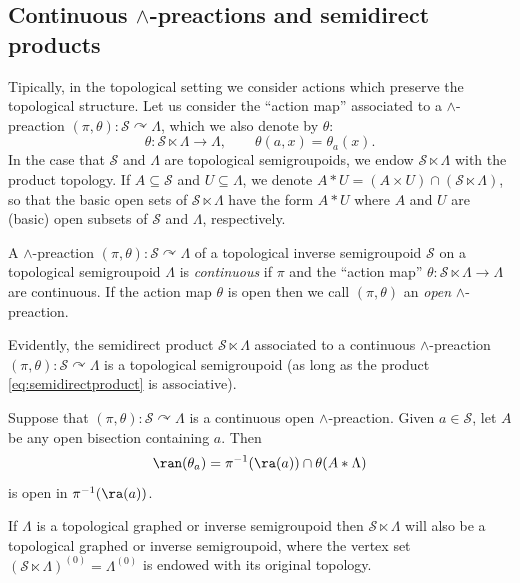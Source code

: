 \subsection{Continuous \texorpdfstring{$\land$}{∧}-preactions and semidirect products}\label{subsec:continuouslandpreactions}

Tipically, in the topological setting we consider actions which preserve the topological structure. Let us consider the ``action map'' associated to a $\land$-preaction $(\pi,\theta)\colon\mathcal{S}\curvearrowright\Lambda$, which we also denote by $\theta$:
\[\theta\colon\mathcal{S}\ltimes\Lambda\to\Lambda,\qquad\theta(a,x)=\theta_a(x).\]
In the case that $\mathcal{S}$ and $\Lambda$ are topological semigroupoids, we endow $\mathcal{S}\ltimes\Lambda$ with the product topology. If $A\subseteq\mathcal{S}$ and $U\subseteq\Lambda$, we denote $A\ast U=(A\times U)\cap(\mathcal{S}\ltimes\Lambda)$, so that the basic open sets of $\mathcal{S}\ltimes\Lambda$ have the form $A\ast U$ where $A$ and $U$ are (basic) open subsets of $\mathcal{S}$ and $\Lambda$, respectively.

\begin{definition}
    A $\land$-preaction $(\pi,\theta)\colon\mathcal{S}\curvearrowright\Lambda$ of a topological inverse semigroupoid $\mathcal{S}$ on a topological semigroupoid $\Lambda$ is \emph{continuous} if $\pi$ and the ``action map'' $\theta\colon\mathcal{S}\ltimes\Lambda\to\Lambda$ are continuous. If the action map $\theta$ is open then we call $(\pi,\theta)$ an \emph{open} $\land$-preaction.
\end{definition}

Evidently, the semidirect product $\mathcal{S}\ltimes\Lambda$ associated to a continuous $\land$-preaction $(\pi,\theta)\colon\mathcal{S}\curvearrowright\Lambda$ is a topological semigroupoid (as long as the product \eqref{eq:semidirectproduct} is associative).

\begin{remark}
Suppose that $(\pi,\theta)\colon\mathcal{S}\curvearrowright\Lambda$ is a continuous open $\land$-preaction. Given $a\in\mathcal{S}$, let $A$ be any open bisection containing $a$. Then \[\ran(\theta_a)=\pi^{-1}(\ra(a))\cap\theta(A\ast\Lambda)\]
is open in $\pi^{-1}(\ra(a))$.
\end{remark}

If $\Lambda$ is a topological graphed or inverse semigroupoid then $\mathcal{S}\ltimes\Lambda$ will also be a topological graphed or inverse semigroupoid, where the vertex set $(\mathcal{S}\ltimes\Lambda)^{(0)}=\Lambda^{(0)}$ is endowed with its original topology.


